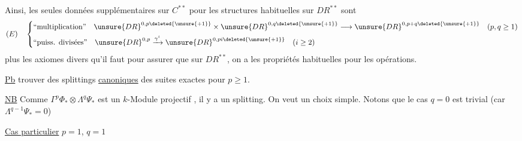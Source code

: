 
Ainsi, les seules données supplémentaires sur $C^{**}$ pour
 les structures habituelles sur $DR^{**}$ sont
\[
(E)\quad\left\{\begin{aligned}
&\text{``multiplication''}\quad
\unsure{DR}^{0,p\deleted{\unsure{+1}}}\times
\unsure{DR}^{0,q\deleted{\unsure{+1}}}\longrightarrow
\unsure{DR}^{0,p+q\deleted{\unsure{+1}}}
\quad(p,q\geq1)\\
&\text{``puiss. divisées''}\quad
\unsure{DR}^{0,p}\xrightarrow{\gamma^i}
\unsure{DR}^{0,pi\deleted{\unsure{+1}}}
\quad(i\geq2)
\end{aligned}\right.
\]
plus les axiomes divers qu'il faut pour assurer que sur $DR^{**}$, on a les propriétés habituelles pour les opérations.

\uline{Pb} trouver des splittings \uline{canoniques} des suites exactes
pour $p\geq1$.

\uline{NB} Comme $\Gamma^p\Phi_*\otimes\Lambda^q\Psi_*$ est un $k$-Module projectif ,
il y a un splitting. On veut un choix simple. Notons que le cas $q=0$ est trivial (car $\Lambda^{q-1}\Psi_*=0$)

\uline{Cas particulier} $p=1$, $q=1$

